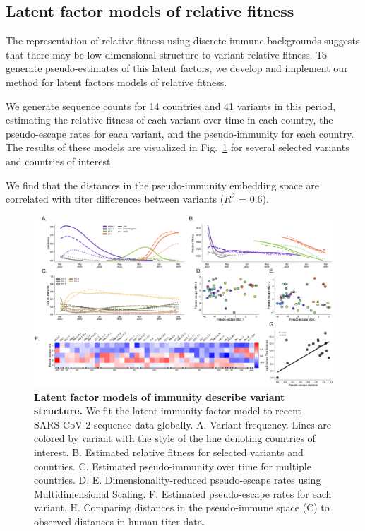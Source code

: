 \documentclass[12pt,oneside,letterpaper]{article}
\begin{document}
\subsection*{Latent factor models of relative fitness}

The representation of relative fitness using discrete immune backgrounds suggests that there may be low-dimensional structure to variant relative fitness.
To generate pseudo-estimates of this latent factors, we develop and implement our method for latent factors models of relative fitness.

We generate sequence counts for 14 countries and 41 variants in this period, estimating the relative fitness of each variant over time in each country, the pseudo-escape rates for each variant, and the pseudo-immunity for each country.
The results of these models are visualized in Fig.~\ref{fig:latent_immune} for several selected variants and countries of interest.

We find that the distances in the pseudo-immunity embedding space are correlated with titer differences between variants ($R^2$ = 0.6).

\begin{figure}[h]
    \centering
    \includegraphics[width=0.8\linewidth]{./figures/latent_immune.png}
    \caption{\textbf{Latent factor models of immunity describe variant structure.}
        We fit the latent immunity factor model to recent SARS-CoV-2 sequence data globally.
        A. Variant frequency. Lines are colored by variant with the style of the line denoting countries of interest.
        B. Estimated relative fitness for selected variants and countries.
        C. Estimated pseudo-immunity over time for multiple countries.
        D, E. Dimensionality-reduced pseudo-escape rates using Multidimensional Scaling.
        F. Estimated pseudo-escape rates for each variant.
        H. Comparing distances in the pseudo-immune space (C) to observed distances in human titer data.
    }
\label{fig:latent_immune}
\end{figure}
\end{document}
